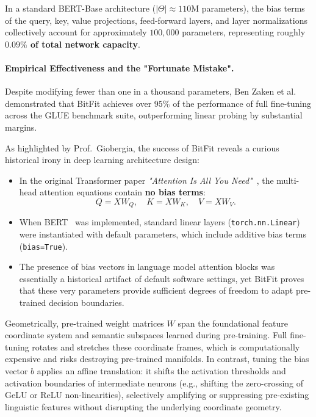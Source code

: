 \documentclass[../../../main.tex]{subfiles}
\begin{document}
In a standard BERT-Base architecture ($|\Theta| \approx 110\text{M}$ parameters), the bias terms of the query, key, value projections, feed-forward layers, and layer normalizations collectively account for approximately $100{,}000$ parameters, representing roughly \textbf{$0.09\%$ of total network capacity}.

\paragraph{Empirical Effectiveness and the "Fortunate Mistake".}
Despite modifying fewer than one in a thousand parameters, Ben Zaken et al.~\citep{zaken2021bitfit} demonstrated that BitFit achieves over $95\%$ of the performance of full fine-tuning across the GLUE benchmark suite, outperforming linear probing by substantial margins.

As highlighted by Prof.~Giobergia, the success of BitFit reveals a curious historical irony in deep learning architecture design:
\begin{itemize}
    \item In the original Transformer paper \textit{"Attention Is All You Need"}~\citep{vaswani2017}, the multi-head attention equations contain \textbf{no bias terms}:
    \begin{equation}
    Q = X W_Q, \quad K = X W_K, \quad V = X W_V.
    \end{equation}
    \item When BERT~\citep{devlin2019} was implemented, standard linear layers (\texttt{torch.nn.Linear}) were instantiated with default parameters, which include additive bias terms (\texttt{bias=True}). 
    \item The presence of bias vectors in language model attention blocks was essentially a historical artifact of default software settings, yet BitFit proves that these very parameters provide sufficient degrees of freedom to adapt pre-trained decision boundaries.
\end{itemize}

\begin{intuition}
Geometrically, pre-trained weight matrices $W$ span the foundational feature coordinate system and semantic subspaces learned during pre-training. Full fine-tuning rotates and stretches these coordinate frames, which is computationally expensive and risks destroying pre-trained manifolds. In contrast, tuning the bias vector $b$ applies an affine translation: it shifts the activation thresholds and activation boundaries of intermediate neurons (e.g., shifting the zero-crossing of GeLU or ReLU non-linearities), selectively amplifying or suppressing pre-existing linguistic features without disrupting the underlying coordinate geometry.
\end{intuition}
\end{document}
